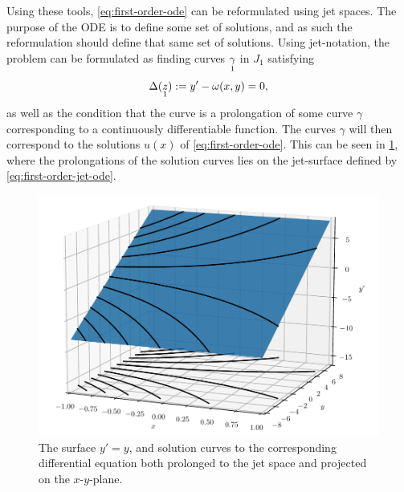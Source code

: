 Using these tools, \cref{eq:first-order-ode} can be reformulated using jet spaces.
The purpose of the ODE is to define some set of solutions, and as such the reformulation should define that same set of solutions.
Using jet-notation, the problem can be formulated as finding curves \(\prolong{\gamma}{1}\) in \(J_1\) satisfying
\begin{equation} \label{eq:first-order-jet-ode}
  \Delta(\prolong{z}{1}) := y' - \omega(x,y) = 0,
\end{equation}
as well as the condition that the curve is a prolongation of some curve \(\gamma\) corresponding to a continuously differentiable function.
The curves \(\gamma\) will then correspond to the solutions \(u(x)\) of \cref{eq:first-order-ode}.
This can be seen in \cref{fig:jet-surface}, where the prolongations of the solution curves lies on the jet-surface defined by \cref{eq:first-order-jet-ode}.
\begin{figure}
  \centering
  \includegraphics[width=.75\textwidth]{images/jet-surface}
  \caption{The surface \(y' = y\), and solution curves to the corresponding differential equation both prolonged to the jet space and projected on the \(x\)-\(y\)-plane.}
  \label{fig:jet-surface}
\end{figure}

